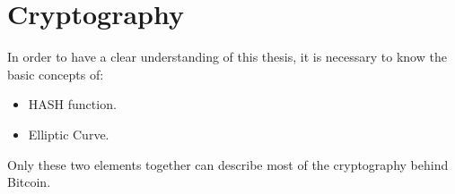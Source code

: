 
\chapter{Cryptography} %

\label{EC} %


\newcommand{\keyword}[1]{\textbf{#1}}
\newcommand{\tabhead}[1]{\textbf{#1}}
\newcommand{\code}[1]{\texttt{#1}}
\newcommand{\file}[1]{\texttt{\bfseries#1}}
\newcommand{\option}[1]{\texttt{\itshape#1}}


In order to have a clear understanding of this thesis, it is necessary to know the basic concepts of:
\begin{itemize}[label=$\checkmark$]
	\item HASH function.
	\item Elliptic Curve.
\end{itemize}
Only these two elements together can describe most of the cryptography behind Bitcoin.

